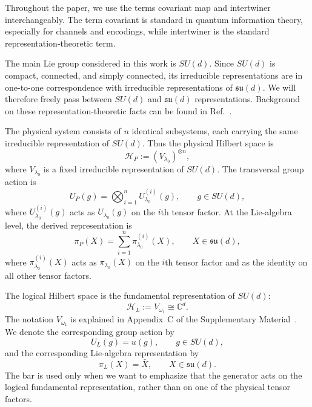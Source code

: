 \documentclass[10pt,twocolumn,superscriptaddress,aps,amsmath,amssymb,citeautoscript,floatfix,prx,longbibliography]{revtex4-2}
\newcounter{alg}
\theoremstyle{plain}
\theoremstyle{plain}
\theoremstyle{plain}
\theoremstyle{plain}
\theoremstyle{plain}
\theoremstyle{plain}
\begin{document}
Throughout the paper, we use the terms covariant map and intertwiner interchangeably. The term covariant is standard in quantum information theory, especially for channels and encodings, while intertwiner is the standard representation-theoretic term.

The main Lie group considered in this work is $SU(d)$. Since $SU(d)$ is compact, connected, and simply connected, its irreducible representations are in one-to-one correspondence with irreducible representations of $\mathfrak{su}(d)$. We will therefore freely pass between $SU(d)$ and $\mathfrak{su}(d)$ representations. Background on these representation-theoretic facts can be found in Ref.~\cite{Hall2015}.

The physical system consists of $n$ identical subsystems, each carrying the same irreducible representation of $SU(d)$. Thus the physical Hilbert space is
\begin{equation}\label{eq:phys_space_rep}
    \mathcal H_P
    :=
    (V_{\lambda_0})^{\otimes n},
\end{equation}
where $V_{\lambda_0}$ is a fixed irreducible representation of $SU(d)$. The transversal group action is
\begin{equation}\label{eq:group_phys_space_rep}
    U_P(g)
    =
    \bigotimes_{i=1}^n
    U_{\lambda_0}^{(i)}(g),
    \qquad
    g\in SU(d),
\end{equation}
where $U_{\lambda_0}^{(i)}(g)$ acts as $U_{\lambda_0}(g)$ on the $i$th tensor factor. At the Lie-algebra level, the derived representation is
\begin{equation}\label{eq:alg_phys_space_rep}
    \pi_P(X)
    =
    \sum_{i=1}^n
    \pi_{\lambda_0}^{(i)}(X),
    \qquad
    X\in\mathfrak{su}(d),
\end{equation}
where $\pi_{\lambda_0}^{(i)}(X)$ acts as $\pi_{\lambda_0}(X)$ on the $i$th tensor factor and as the identity on all other tensor factors.

The logical Hilbert space is the fundamental representation of $SU(d)$:
\begin{equation}\label{eq:log_space_rep}
    \mathcal H_L
    :=
    V_{\omega_1}
    \cong
    \mathbb C^d .
\end{equation}
The notation $V_{\omega_1}$ is explained in Appendix~C of the Supplementary Material~\cite{SuppMat}. We denote the corresponding group action by
$$
    U_L(g)
    =
    u(g),
    \qquad
    g\in SU(d),
$$
and the corresponding Lie-algebra representation by
$$
    \pi_L(X)
    =
    \bar X,
    \qquad
    X\in\mathfrak{su}(d).
$$
The bar is used only when we want to emphasize that the generator acts on the logical fundamental representation, rather than on one of the physical tensor factors.
\end{document}
